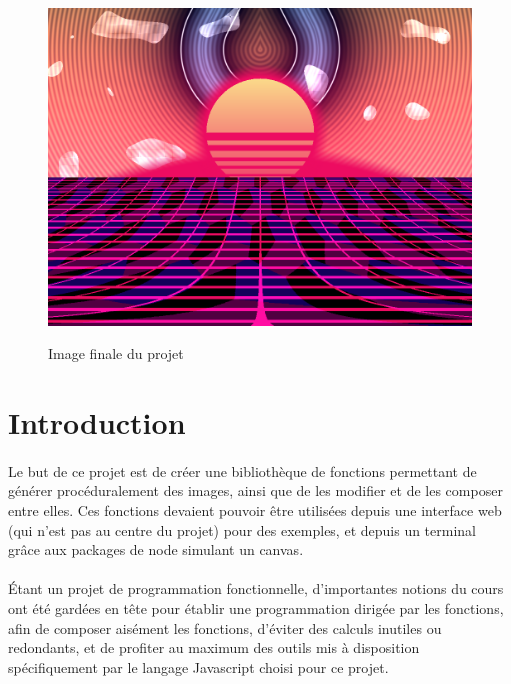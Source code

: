 \documentclass[a4paper]{article}
\begin{document}
\tableofcontents

\begin{figure}[hb]
    \centering ~\\[2cm]
    \includegraphics[width=0.8\columnwidth]{finalimage.png}
    \caption{Image finale du projet}
    \label{fig:finalimage}
\end{figure}

\newpage

\section{Introduction}

\paragraph{}
Le but de ce projet\cite{sujet} est de créer une bibliothèque de fonctions permettant de générer procéduralement des images, ainsi que de les modifier et de les composer entre elles. Ces fonctions devaient pouvoir être utilisées depuis une interface web (qui n'est pas au centre du projet) pour des exemples, et depuis un terminal grâce aux packages de node simulant un canvas.

\paragraph{}
Étant un projet de programmation fonctionnelle, d'importantes notions du cours\cite{cours} ont été gardées en tête pour établir une programmation dirigée par les fonctions, afin de composer aisément les fonctions, d'éviter des calculs inutiles ou redondants, et de profiter au maximum des outils mis à disposition spécifiquement par le langage Javascript choisi pour ce projet.
\end{document}
